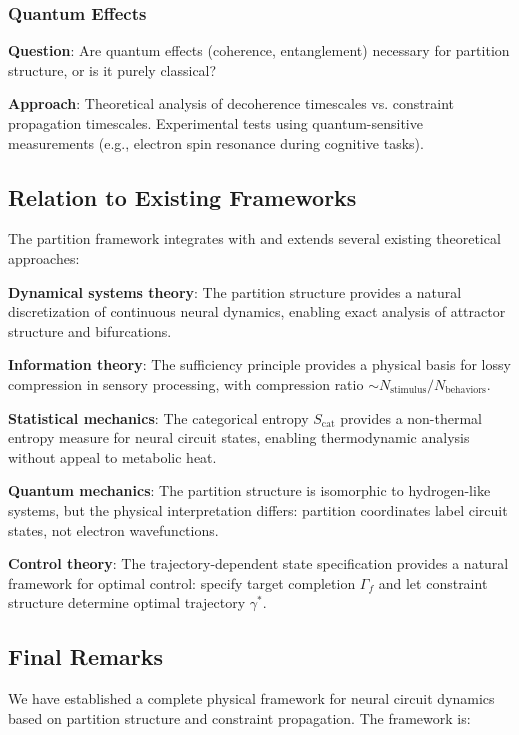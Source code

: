 \documentclass[aps,prd,twocolumn,superscriptaddress,floatfix,nofootinbib]{revtex4-2}
\theoremstyle{remark}
\begin{document}
\subsubsection{Quantum Effects}

\textbf{Question}: Are quantum effects (coherence, entanglement) necessary for partition structure, or is it purely classical?

\textbf{Approach}: Theoretical analysis of decoherence timescales vs. constraint propagation timescales. Experimental tests using quantum-sensitive measurements (e.g., electron spin resonance during cognitive tasks).

\subsection{Relation to Existing Frameworks}

The partition framework integrates with and extends several existing theoretical approaches:

\textbf{Dynamical systems theory}: The partition structure provides a natural discretization of continuous neural dynamics, enabling exact analysis of attractor structure and bifurcations.

\textbf{Information theory}: The sufficiency principle provides a physical basis for lossy compression in sensory processing, with compression ratio $\sim N_{\text{stimulus}} / N_{\text{behaviors}}$.

\textbf{Statistical mechanics}: The categorical entropy $S_{\text{cat}}$ provides a non-thermal entropy measure for neural circuit states, enabling thermodynamic analysis without appeal to metabolic heat.

\textbf{Quantum mechanics}: The partition structure is isomorphic to hydrogen-like systems, but the physical interpretation differs: partition coordinates label circuit states, not electron wavefunctions.

\textbf{Control theory}: The trajectory-dependent state specification provides a natural framework for optimal control: specify target completion $\Gamma_f$ and let constraint structure determine optimal trajectory $\gamma^*$.

\subsection{Final Remarks}

We have established a complete physical framework for neural circuit dynamics based on partition structure and constraint propagation. The framework is:
\end{document}
